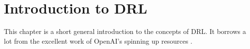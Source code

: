 \chapter{Introduction to DRL}

This chapter is a short general introduction to the concepts of DRL. It borrows a lot from the excellent work of OpenAI's spinning up resources \cite{spinningup}.
